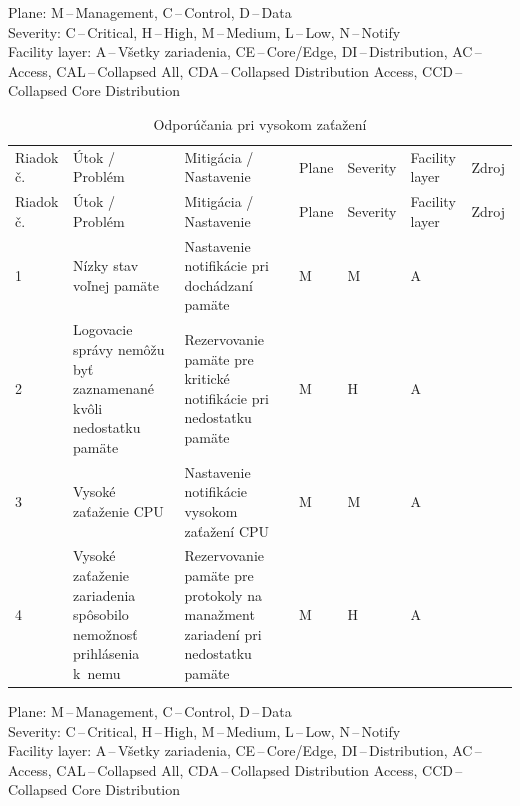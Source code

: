 \vspace{-1em}
{\tiny 
	\noindent
	Plane: M\,--\,Management, C\,--\,Control, D\,--\,Data\\
	Severity: C\,--\,Critical, H\,--\,High, M\,--\,Medium, L\,--\,Low, N\,--\,Notify\\
	Facility layer: A\,--\,Všetky zariadenia, CE\,--\,Core/Edge, DI\,--\,Distribution, AC\,--\,Access, CAL\,--\,Collapsed All, CDA\,--\,Collapsed Distribution Access, CCD\,--\,Collapsed Core Distribution}

\begin{longtable}[!htbp]{|C{2.5em}L{11em}L{11em}C{2.5em}C{4em}C{5em}L{2.5em}|}
	\caption{Odporúčania pri vysokom zaťažení}
	\label{tab:highload}\\ \hline
	\mbox{Riadok} č.&Útok / Problém	&Mitigácia / Nastavenie	&Plane	&Severity	&Facility layer	&Zdroj\\ \hhline{=======}
	\endfirsthead 
	\hline
	\centering
	
	Riadok č.	&Útok / Problém	&Mitigácia / Nastavenie	&Plane	&Severity	&Facility layer	&Zdroj\\ \hhline{=======}
	\endhead
	
	 1	&Nízky stav voľnej pamäte	&Nastavenie notifikácie pri dochádzaní pamäte	&M	&M	&A	& \cite{Singh2018}
	
	\cite{uYLsMtQInofenpV3}\\
	2	&Logovacie správy nemôžu byť zaznamenané kvôli nedostatku pamäte	&Rezervovanie pamäte pre kritické notifikácie pri nedostatku pamäte	&M	&H	&A	& \cite{Singh2018}
	
	\cite{uYLsMtQInofenpV3}\\
	 3	&Vysoké zaťaženie CPU	&Nastavenie notifikácie vysokom zaťažení CPU	&M	&M	&A	& \cite{Singh2018}
	
	\cite{uYLsMtQInofenpV3}\\
	4	&Vysoké zaťaženie zariadenia spôsobilo nemožnosť prihlásenia k~nemu	&Rezervovanie pamäte pre protokoly na manažment zariadení pri nedostatku pamäte	&M	&H	&A	& \cite{Singh2018}\\	
	\hline
\end{longtable}%
\vspace{-1em}
{\tiny 
	\noindent
	Plane: M\,--\,Management, C\,--\,Control, D\,--\,Data\\
	Severity: C\,--\,Critical, H\,--\,High, M\,--\,Medium, L\,--\,Low, N\,--\,Notify\\
	Facility layer: A\,--\,Všetky zariadenia, CE\,--\,Core/Edge, DI\,--\,Distribution, AC\,--\,Access, CAL\,--\,Collapsed All, CDA\,--\,Collapsed Distribution Access, CCD\,--\,Collapsed Core Distribution}

